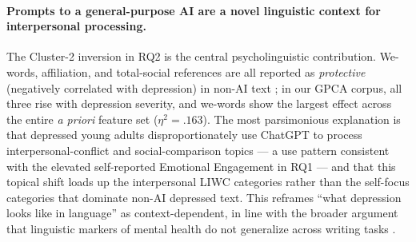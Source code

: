 \documentclass[letterpaper]{article}
\begin{document}
\paragraph{Prompts to a general-purpose AI are a novel linguistic context for interpersonal processing.} The Cluster-2 inversion in RQ2 is the central psycholinguistic contribution. We-words, affiliation, and total-social references are all reported as \emph{protective} (negatively correlated with depression) in non-AI text \citep{tackman2019pronouns,guntuku2022loneliness}; in our GPCA corpus, all three rise with depression severity, and we-words show the largest effect across the entire \emph{a priori} feature set ($\eta^2=.163$). The most parsimonious explanation is that depressed young adults disproportionately use ChatGPT to process interpersonal-conflict and social-comparison topics --- a use pattern consistent with the elevated self-reported Emotional Engagement in RQ1 --- and that this topical shift loads up the interpersonal LIWC categories rather than the self-focus categories that dominate non-AI depressed text. This reframes ``what depression looks like in language'' as context-dependent, in line with the broader argument that linguistic markers of mental health do not generalize across writing tasks \citep{rai2024racemarkers}.
\end{document}
